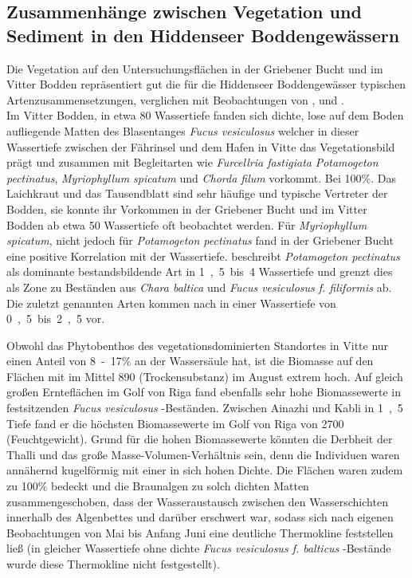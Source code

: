 \subsection{Zusammenhänge zwischen Vegetation und Sediment in den Hiddenseer Boddengewässern}

Die Vegetation auf den Untersuchungsflächen in der Griebener Bucht und im Vitter Bodden repräsentiert gut die für die Hiddenseer Boddengewässer typischen Artenzusammensetzungen, verglichen mit Beobachtungen von \cite{flugge_2004}, \cite{kuenzenbach_1955} und \cite{muller_1961}.
\\
Im Vitter Bodden, in etwa \unit{80}{\centi\metre} Wassertiefe fanden sich dichte, lose auf dem Boden aufliegende Matten des Blasentanges \textit{Fucus vesiculosus} welcher in dieser Wassertiefe zwischen der Fährinsel und dem Hafen in Vitte das Vegetationsbild prägt und zusammen mit Begleitarten wie \textit{Furcellria fastigiata} \textit{Potamogeton pectinatus}, \textit{Myriophyllum spicatum} und \textit{Chorda filum} vorkommt. Bei \unit{100}{\%}. Das Laichkraut und das Tausendblatt sind sehr häufige und typische Vertreter der Bodden, sie konnte ihr Vorkommen in der Griebener Bucht und im Vitter Bodden ab etwa \unit{50}{\centi\metre} Wassertiefe oft beobachtet werden. Für \textit{Myriophyllum spicatum}, nicht jedoch für \textit{Potamogeton pectinatus} fand \cite{flugge_2004} in der Griebener Bucht eine positive Korrelation mit der Wassertiefe. 
\cite{muller_1961}  beschreibt \textit{Potamogeton pectinatus} als dominante bestandsbildende Art in \unit{1,5 bis 4}{\metre} Wassertiefe und grenzt dies als Zone zu Beständen aus \textit{Chara baltica} und \textit{Fucus vesiculosus f. filiformis} ab. Die zuletzt genannten Arten kommen nach  \cite{muller_1961} in einer Wassertiefe von \unit{0,5 bis 2,5}{\metre} vor. 

Obwohl das Phytobenthos des vegetationsdominierten Standortes in Vitte nur einen Anteil von \unit{8-17}{\%} an der Wassersäule hat, ist die Biomasse auf den Flächen mit im Mittel \unit{890}{\gram\per\metre\suqared} (Trockensubstanz) im August extrem hoch. Auf gleich großen Ernteflächen im Golf von Riga fand \cite{martin_1999} ebenfalls sehr hohe Biomassewerte in festsitzenden \textit{Fucus vesiculosus} -Beständen. Zwischen Ainazhi und Kabli in \unit{1,5}{\metre} Tiefe fand er die höchsten Biomassewerte im Golf von Riga von \unit{2700}{\gram\per\metre\suqared} (Feuchtgewicht). Grund für die hohen Biomassewerte könnten die Derbheit der Thalli und das große Masse-Volumen-Verhältnis sein, denn die Individuen waren annähernd kugelförmig mit einer in sich hohen Dichte. Die Flächen waren zudem zu \unit{100}{\%} bedeckt und die Braunalgen zu solch dichten Matten zusammengeschoben, dass  der Wasseraustausch zwischen den Wasserschichten innerhalb des Algenbettes und darüber erschwert war, sodass sich nach eigenen Beobachtungen von Mai bis Anfang Juni eine deutliche Thermokline feststellen ließ (in gleicher Wassertiefe ohne dichte \textit{Fucus vesiculosus f. balticus} -Bestände wurde diese Thermokline nicht festgestellt). 

